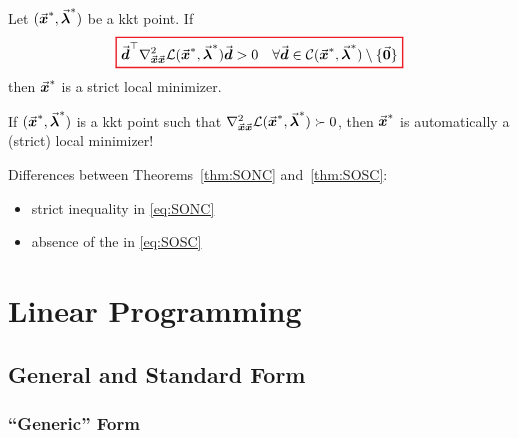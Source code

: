 \begin{theorem}\label{thm:SOSC}
Let \( (\vec{\boldsymbol{x}}^{\ast},\vec{\boldsymbol{\lambda}}^{\ast}) \) be a \gls{kkt} point. If
\begin{equation}\label{eq:SOSC}
{\color{Red}
\setlength{\fboxrule}{1pt}
\boxed{ 
\color{black}
\vect{d}^{\top} \nabla^{2}_{\vect{x}\vect{x}} \mathcal{L}(\vect{x}^{\ast},\vect{\lambda}^{\ast}) \vect{d} > 0 \quad \forall \vect{d}\in\mathcal{C}(\vect{x}^{\ast},\vect{\lambda}^{\ast}) \setminus \{ \vect{0} \}
}
}
\end{equation}
then \( \vec{\boldsymbol{x}}^{\ast} \) is a strict local minimizer.
\end{theorem}
If \((\vec{\boldsymbol{x}}^{\ast},\vec{\boldsymbol{\lambda}}^{\ast})\) is a \gls{kkt} point such that \(\nabla^{2}_{\vec{\boldsymbol{x}}\vec{\boldsymbol{x}}} \mathcal{L}(\vec{\boldsymbol{x}}^{\ast},\vec{\boldsymbol{\lambda}}^{\ast}) \succ 0\), then \(\vec{\boldsymbol{x}}^{\ast}\) is automatically a (strict) local minimizer!

Differences between Theorems~\ref{thm:SONC} and~\ref{thm:SOSC}:
\begin{itemize}
\item strict inequality in \eqref{eq:SONC}
\item absence of the  in \eqref{eq:SOSC}
\end{itemize}


\clearpage



















\section{Linear Programming}\label{sec:linear_programming}

\subsection{General and Standard Form}

\subsubsection{``Generic'' Form}\label{sec:genericform_linear_programming}

